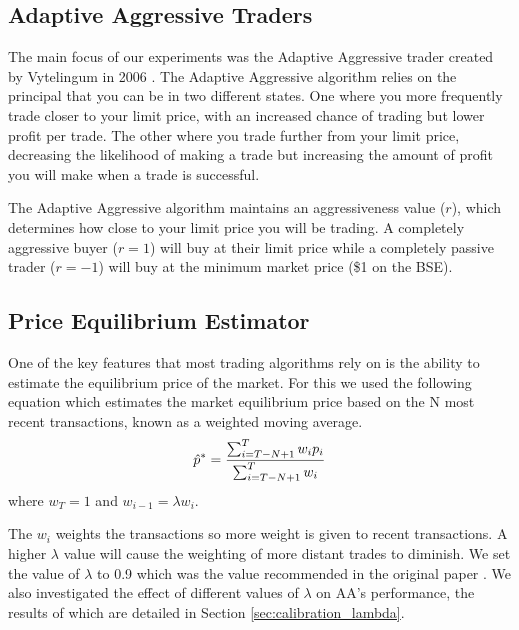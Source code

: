 \documentclass[preprint]{acm_proc_article-sp} %
\begin{document}
\subsection{Adaptive Aggressive Traders} \label{sec:AA}
The main focus of our experiments was the Adaptive Aggressive trader created by
Vytelingum in 2006 \cite{AA_thesis}. The Adaptive Aggressive algorithm relies on the principal that you can be in
two different states. One where you more frequently trade closer to your limit
price, with an increased chance of trading but lower profit per trade. The other where you
trade further from your limit price, decreasing the likelihood of making a
trade but increasing the amount of profit you will make when a trade is
successful.

The Adaptive Aggressive algorithm maintains an aggressiveness value ($r$), which
determines how close to your limit price you will be trading. A completely
aggressive buyer ($r = 1$) will buy at their limit price while a completely
passive trader ($r = -1$) will buy at the minimum market price (\$1 on the BSE).\\


\subsection{Price Equilibrium Estimator}
One of the key features that most trading algorithms rely on is the ability to
estimate the equilibrium price of the market. For this we used the following
equation which estimates the market equilibrium price based on the N most
recent transactions, known as a weighted moving average.
\begin{equation}
    \hat p^* = \frac{\sum^T_{i=T-N+1}w_ip_i}{\sum^T_{i=T-N+1}w_i}\\
    \label{eqn:equilibrium_estimator}
\end{equation}
where $w_T = 1$ and $w_{i-1} = \lambda w_i$.

The $w_i$ weights the transactions so more weight is given to recent
transactions. A higher $\lambda$ value will cause the weighting of more distant
trades to diminish. We set the value of $\lambda$ to 0.9 which was the value
recommended in the original paper \cite[p.~100]{AA_thesis}. We also investigated the effect of different values of $\lambda$ on AA's performance, the results of which are detailed in Section \ref{sec:calibration_lambda}.
\end{document}
